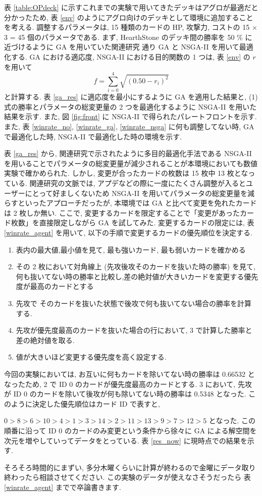 \documentclass{jarticle}     %
\begin{document}
表 \ref{table:OPdeck} に示すこれまでの実験で用いてきたデッキはアグロが最適だと分かったため, 表 \ref{env} のようにアグロ向けのデッキとして環境に追加することを考える. 調整するパラメータは, 15 種類のカードの HP, 攻撃力, コストの 15 × 3 = 45 個のパラメータである. 
まず, HearthStone のデッキ間の勝率を 50 \% に近づけるように GA を用いていた関連研究 \cite{DBLP:journals/corr/abs-1907-01623} 通り GA と NSGA-II を用いて最適化する.
GA における適応度, NSGA-II における目的関数の 1 つは, 表 \ref{env} の $r$ を用いて
\begin{equation}
  f = \sum_{i=0}^4 \sqrt{(0.50 - r_i)^2}
\end{equation}
と計算する. 
表 \ref{ga_res} に適応度を最小にするように GA を適用した結果と, (1) 式の勝率とパラメータの総変更量の 2 つを最適化するように NSGA-II を用いた結果を示す. また, 図 \ref{fig:front} に NSGA-II で得られたパレートフロントを示す. 
また, 表 \ref{winrate_no}, \ref{winrate_ga}, \ref{winrate_nsga} に何も調整してない時, GA で最適化した時, NSGA-II で最適化した時の環境を示す.\par
表 \ref{ga_res} から, 関連研究で示されたように多目的最適化手法である NSGA-II を用いることでパラメータの総変更量が減少されることが本環境においても数値実験で確かめられた. しかし, 変更が合ったカードの枚数は 15 枚中 13 枚となっている. 関連研究の文脈では, アプデなどの際に一度にたくさん調整が入るとユーザーにとって好ましくないため NSGA-II を用いてパラメータの総変更量を減らすといったアプローチだったが,  本環境では GA と比べて変更を免れたカードは 2 枚しか無い. ここで, 変更するカードを限定することで「変更があったカード枚数」を直接限定しながら GA を試してみた. 
変更するカードの限定には, 表 \ref{winrate_agent} を用いて, 以下の手順で変更するカードの優先順位を決定する. 
\begin{enumerate}
  \item 表内の最大値,最小値を見て, 最も強いカード, 最も弱いカードを確かめる
  \item その 2 枚において対角線上 (先攻後攻そのカードを抜いた時の勝率) を見て, 何も抜いてない時の勝率と比較し,差の絶対値が大きいカードを変更する優先度が最高のカードとする
  \item 先攻で そのカードを抜いた状態で後攻で何も抜いてない場合の勝率を計算する.
  \item 先攻が優先度最高のカードを抜いた場合の行において, 3 で計算した勝率と差の絶対値を取る. 
  \item 値が大きいほど変更する優先度を高く設定する.
\end{enumerate}
今回の実験においては, お互いに何もカードを除いてない時の勝率は 0.66532 となったため,  2 で ID 0 のカードが優先度最高のカードとする. 3 において, 先攻が ID 0 のカードを除いて後攻が何も除いてない時の勝率は 0.5348 となった. 
このように決定した優先順位はカード ID で表すと, \par
$0 > 8 > 6 > 10 > 4 > 1 > 3 > 14 > 2 > 11 > 13 > 9 > 7 > 12 > 5$ 
となった. 
この順番に沿って ID 0 のカードのみ変更という条件から徐々に GA による解空間を次元を増やしていってデータをとっている.
表 \ref{res_now} に現時点での結果を示す. \par
そろそろ時間的にまずい, 多分木曜くらいに計算が終わるので金曜にデータ取り終わったら相談させてください. この実験のデータが使えなさそうだったら 表 \ref{winrate_agent} までで卒論書きます.
\end{document}
